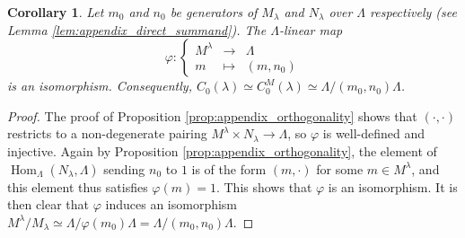 \documentclass[12pt]{amsart}
\DeclareMathOperator{\Hom}{Hom}
\theoremstyle{defstyle}
\theoremstyle{thmstyle}
\newtheorem{corAppendix}{Corollary}
\begin{document}
\begin{corAppendix}\label{coro:appendix_generator_congruence_module}
	Let $m_0$ and $n_0$ be generators of $M_\lambda$ and $N_\lambda$ over $\Lambda$ respectively (see Lemma \ref{lem:appendix_direct_summand}). The $\Lambda$-linear map 
	\[\varphi \colon \left\{ \begin{array}{rcl}
		M^\lambda &\to& \Lambda \\ m & \mapsto & (m,n_0)
	\end{array} \right.\]
is an isomorphism. Consequently, $C_0(\lambda)\simeq C_0^M(\lambda) \simeq \Lambda/(m_0,n_0)\Lambda$.
\end{corAppendix}
\begin{proof}
The proof of Proposition \ref{prop:appendix_orthogonality} shows that $(\cdot,\cdot)$ restricts to a non-degenerate pairing $M^\lambda \times N_\lambda \to \Lambda$, so $\varphi$ is well-defined and injective. Again by Proposition \ref{prop:appendix_orthogonality}, the element of $\Hom_\Lambda(N_\lambda,\Lambda)$ sending $n_0$ to $1$ is of the form $(m,\cdot)$ for some $m\in M^\lambda$, and this element thus satisfies $\varphi(m)=1$. This shows that $\varphi$ is an isomorphism. It is then clear that $\varphi$ induces an isomorphism $M^\lambda/M_\lambda \simeq \Lambda/\varphi(m_0)\Lambda=\Lambda/(m_0,n_0)\Lambda$.
\end{proof}



\end{document}
